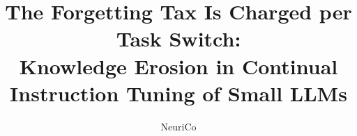 \documentclass{article}
\title{The Forgetting Tax Is Charged per Task Switch:\\ Knowledge Erosion in Continual Instruction Tuning of Small LLMs}
\author{NeuriCo}
\begin{document}
\maketitle

\begin{abstract}

\end{abstract}










\appendix

\end{document}
